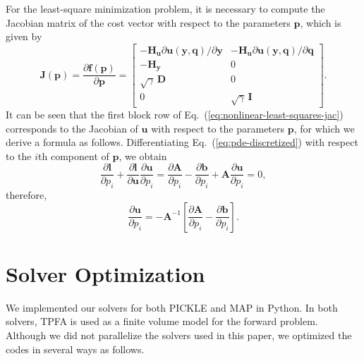 \documentclass{agujournal2019}
\begin{document}
For the least-square minimization problem, it is necessary to compute the Jacobian matrix of the cost vector with respect to the parameters $\mathbf{p}$, which is given by
%
\begin{equation}
  \label{eq:nonlinear-least-squares-jac}
  \mathbf{J}(\mathbf{p}) = \frac{\partial \mathbf{f}(\mathbf{p})}{\partial \mathbf{p}} = 
  \begin{bmatrix}
    - \mathbf{H}_{\mathbf{u}} \partial \mathbf{u}(\mathbf{y}, \mathbf{q}) / \partial \mathbf{y} & - \mathbf{H}_{\mathbf{u}} \partial \mathbf{u}(\mathbf{y}, \mathbf{q}) / \partial \mathbf{q}\\
    -\mathbf{H}_{\mathbf{y}} & 0\\
    \sqrt{\gamma} \, \mathbf{D} & 0\\
    0 & \sqrt{\gamma} \, \mathbf{I}
  \end{bmatrix}.
\end{equation}
%
It can be seen that the first block row of Eq.~(\ref{eq:nonlinear-least-squares-jac}) corresponds to the Jacobian of $\mathbf{u}$ with respect to the parameters $\mathbf{p}$, for which we derive a formula as follows.
Differentiating Eq.~(\ref{eq:pde-discretized}) with respect to the $i$th component of $\mathbf{p}$, we obtain
%
\begin{equation*}
  \frac{\partial \mathbf{l}}{\partial p_i} + \frac{\partial \mathbf{l}}{\partial \mathbf{u}} \frac{\partial \mathbf{u}}{\partial p_i} = \frac{\partial \mathbf{A}}{\partial p_i} - \frac{\partial \mathbf{b}}{\partial p_i} + \mathbf{A} \frac{\partial \mathbf{u}}{\partial p_i} = 0,
\end{equation*}
%
therefore,
%
\begin{equation}
    \label{eq:adjoint}
    \frac{\partial \mathbf{u}}{\partial p_i} = - \mathbf{A}^{-1} \left [ \frac{\partial \mathbf{A}}{\partial p_i} - \frac{\partial \mathbf{b}}{\partial p_i} \right ].
\end{equation}


\section{Solver Optimization}
\label{sec:optimization}

We implemented our solvers for both PICKLE and MAP in Python. In both solvers, TPFA is used as a finite volume model for the forward problem.
Although we did not parallelize the solvers used in this paper, we optimized the codes in several ways as follows.
\end{document}
